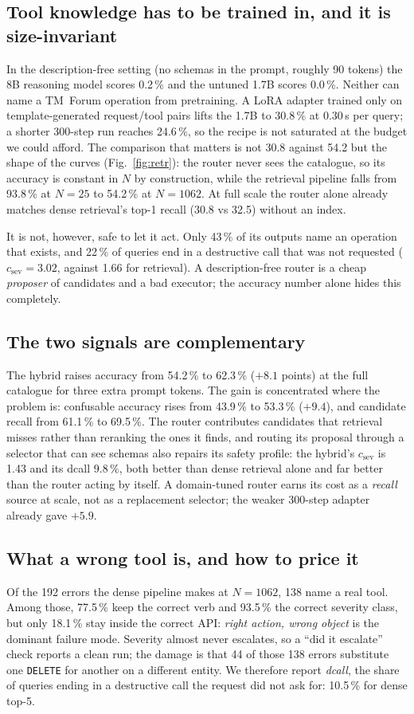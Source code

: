 \subsection{Tool knowledge has to be trained in, and it is size-invariant}
In the description-free setting (no schemas in the prompt, roughly 90 tokens) the 8B reasoning model scores 0.2\,\% and the untuned 1.7B scores 0.0\,\%.
Neither can name a TM~Forum operation from pretraining. A LoRA adapter trained
only on template-generated request/tool pairs lifts the 1.7B to 30.8\,\% at
0.30\,s per query; a shorter 300-step run reaches 24.6\,\%, so the recipe is
not saturated at the budget we could afford. The comparison that matters is
not 30.8 against 54.2 but the shape of the curves (Fig.~\ref{fig:retr}):
the router never sees the catalogue, so its accuracy is constant in $N$ by
construction, while the retrieval pipeline falls from 93.8\,\% at $N=25$ to
54.2\,\% at $N=1062$. At full scale the router alone already matches dense
retrieval's top-1 recall (30.8 vs 32.5) without an index.

It is not, however, safe to let it act. Only 43\,\% of its outputs name an
operation that exists, and 22\,\% of queries end in a destructive call that
was not requested ($c_{\mathrm{sev}} = 3.02$, against 1.66 for retrieval).
A description-free router is a cheap \emph{proposer} of candidates and a bad
executor; the accuracy number alone hides this completely.

\subsection{The two signals are complementary}
The hybrid raises accuracy from 54.2\,\% to 62.3\,\% ($+8.1$ points) at the
full catalogue for three extra prompt tokens. The
gain is concentrated where the problem is: confusable accuracy rises from
43.9\,\% to 53.3\,\% ($+9.4$), and candidate recall from 61.1\,\% to
69.5\,\%. The router contributes candidates that retrieval misses rather than
reranking the ones it finds, and routing its proposal through a selector that
can see schemas also repairs its safety profile: the hybrid's $c_{\mathrm{sev}}$
is 1.43 and its dcall 9.8\,\%, both better than dense retrieval alone and far
better than the router acting by itself. A domain-tuned router earns its cost
as a \emph{recall} source at scale, not as a replacement selector; the weaker 300-step adapter already gave $+5.9$.

\subsection{What a wrong tool is, and how to price it}
Of the 192 errors the dense pipeline makes at $N=1062$, 138 name a real tool.
Among those, 77.5\,\% keep the correct verb and 93.5\,\% the correct severity
class, but only 18.1\,\% stay inside the correct API: \emph{right action,
wrong object} is the dominant failure mode. Severity almost never escalates,
so a ``did it escalate'' check reports a clean run; the damage is that 44 of
those 138 errors substitute one \texttt{DELETE} for another on a different
entity. We therefore report \emph{dcall}, the share of queries ending in a
destructive call the request did not ask for: 10.5\,\% for dense top-5.


